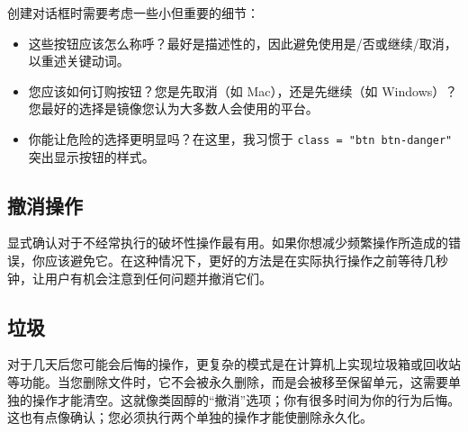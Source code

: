 创建对话框时需要考虑一些小但重要的细节：
\begin{itemize}
    \item 这些按钮应该怎么称呼？最好是描述性的，因此避免使用是/否或继续/取消，以重述关键动词。
    \item 您应该如何订购按钮？您是先取消（如 Mac），还是先继续（如 Windows）？您最好的选择是镜像您认为大多数人会使用的平台。
    \item 你能让危险的选择更明显吗？在这里，我习惯于 \verb|class = "btn btn-danger"| 突出显示按钮的样式。
\end{itemize}

\subsection{撤消操作}
显式确认对于不经常执行的破坏性操作最有用。如果你想减少频繁操作所造成的错误，你应该避免它。在这种情况下，更好的方法是在实际执行操作之前等待几秒钟，让用户有机会注意到任何问题并撤消它们。

\subsection{垃圾}
对于几天后您可能会后悔的操作，更复杂的模式是在计算机上实现垃圾箱或回收站等功能。当您删除文件时，它不会被永久删除，而是会被移至保留单元，这需要单独的操作才能清空。这就像类固醇的“撤消”选项；你有很多时间为你的行为后悔。这也有点像确认；您必须执行两个单独的操作才能使删除永久化。